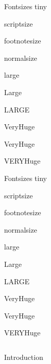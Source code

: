 \documentclass[final]{beamer}\usepackage[]{graphicx}\usepackage[]{color}
\begin{document}
  \begin{frame}{}
    \vfill
    \begin{block}{\large Fontsizes}
      \centering
      {\tiny tiny}\par
      {\scriptsize scriptsize}\par
      {\footnotesize footnotesize}\par
      {\normalsize normalsize}\par
      {\large large}\par
      {\Large Large}\par
      {\LARGE LARGE}\par
      {\veryHuge VeryHuge}\par
      {\VeryHuge VeryHuge}\par
      {\VERYHuge VERYHuge}\par
    \end{block}
    \vfill
    \vfill
    \begin{alertblock}{\large Fontsizes}
      \centering
      {\tiny tiny}\par
      {\scriptsize scriptsize}\par
      {\footnotesize footnotesize}\par
      {\normalsize normalsize}\par
      {\large large}\par
      {\Large Large}\par
      {\LARGE LARGE}\par
      {\veryHuge VeryHuge}\par
      {\VeryHuge VeryHuge}\par
      {\VERYHuge VERYHuge}\par
    \end{alertblock}
    \vfill
    \begin{columns}[t]
      \begin{column}{.48\linewidth}
        \begin{block}{Introduction}


\end{block}
\end{column}
\end{columns}
\end{frame}
\end{document}
